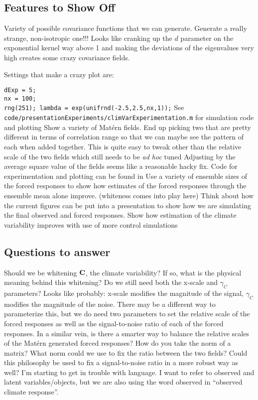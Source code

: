 \documentclass[11pt]{article}
\newcommand{\C}{\ensuremath{\text{Cov}}}
\def\C{\textbf{\text{C}}}
\begin{document}
\subsection{Features to Show Off}
\begin{outline}
\1 Variety of possible covariance functions that we can generate. Generate a really strange, non-isotropic one!!!
\2 Looks like cranking up the $d$ parameter on the exponential kernel way above 1 and making the deviations of the eigenvalues very high creates some crazy covariance fields.

\2Settings that make a crazy plot are: 

\texttt{dExp = 5; }\\
\texttt{nx = 100;}\\
\texttt{rng(251); lambda = exp(unifrnd(-2.5,2.5,nx,1));}
\2 See \texttt{code/presentationExperiments/climVarExperimentation.m} for simulation code and plotting
\1 Show a variety of Mat\'ern fields. End up picking two that are pretty different in terms of correlation range so that we can maybe see the pattern of each when added together.
\2 This is quite easy to tweak other than the relative scale of the two fields which still needs to be \emph{ad hoc} tuned 
\2 Adjusting by the average square value of the fields seems like a reasonable hacky fix. 
\2 Code for experimentation and plotting can be found in 
\1 Use a variety of ensemble sizes of the forced responses to show how estimates of the forced responses through the ensemble mean alone improve. (whiteness comes into play here)
\1 Think about how the current figures can be put into a presentation to show how we are simulating the final observed and forced responses.
\1 Show how estimation of the climate variability improves with use of more control simulations

\end{outline}

\clearpage
\subsection{Questions to answer}
\begin{outline}
\1 Should we be whitening $\C$, the climate variability? If so, what is the physical meaning behind this whitening?
\1 Do we still need both the x-scale and $\gamma_C$ parameters? Looks like probably: x-scale modifies the magnitude of the signal, $\gamma_C$ modifies the magnitude of the noise. There may be a different way to parameterize this, but we do need two parameters to set the relative scale of the forced responses as well as the signal-to-noise ratio of each of the forced responses.
\2 In a similar vein, is there a smarter way to balance the relative scales of the Mat\'ern generated forced responses? How do you take the norm of a matrix? What norm could we use to fix the ratio between the two fields?
\2 Could this philosophy be used to fix a signal-to-noise ratio in a more robust way as well?
\1 I'm starting to get in trouble with language. I want to refer to observed and latent variables/objects, but we are also using the word observed in ``observed climate response''. 
\end{outline}
\end{document}
